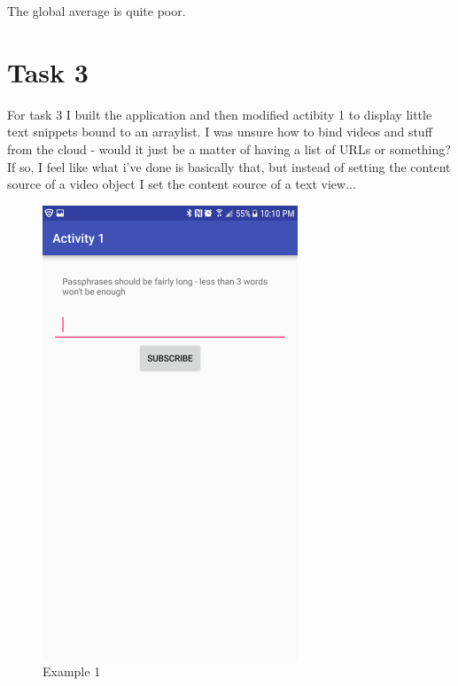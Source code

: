 \documentclass{article}
\begin{document}
The global average is quite poor.

\section{Task 3}
For task 3 I built the application and then modified actibity 1 to display little text snippets bound to an arraylist. 
I was unsure how to bind videos and stuff from the cloud - would it just be a matter of having a list of URLs or something?
If so, I feel like what i've done is basically that, but instead of setting the content source of a video object I set the content source of a text view...

\begin{figure}[ht]
      \includegraphics[width=3in]{img/t3s1.png}
      \centering
      \caption{Example 1}
\end{figure}
\end{document}
